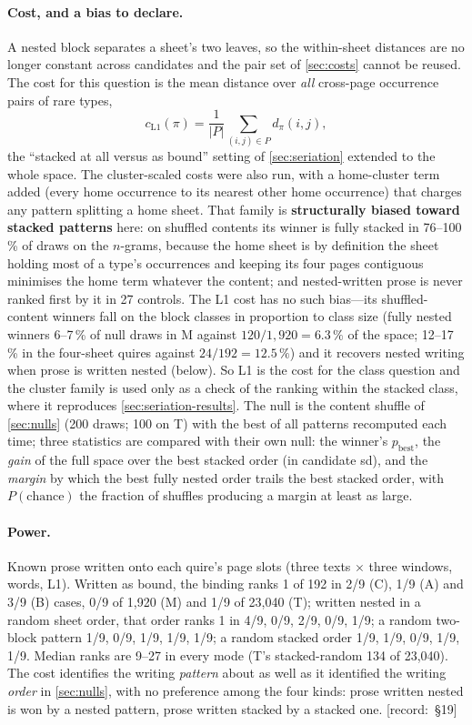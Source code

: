 \documentclass[11pt,a4paper]{article}
\newcommand{\src}[1]{{\footnotesize\color{muted}\sffamily\mbox{[record: \S#1]}}}
\begin{document}
\paragraph{Cost, and a bias to declare.} A nested block separates a sheet's two leaves, so the within-sheet distances are no longer constant across candidates and the pair set of \cref{sec:costs} cannot be reused. The cost for this question is the mean distance over \emph{all} cross-page occurrence pairs of rare types,
\begin{equation}
c_{\mathrm{L1}}(\pi)=\frac{1}{|P|}\sum_{(i,j)\in P} d_\pi(i,j),
\label{eq:l1all}
\end{equation}
the ``stacked at all versus as bound'' setting of \cref{sec:seriation} extended to the whole space. The cluster-scaled costs were also run, with a home-cluster term added (every home occurrence to its nearest other home occurrence) that charges any pattern splitting a home sheet. That family is \textbf{structurally biased toward stacked patterns} here: on shuffled contents its winner is fully stacked in 76--100\,\% of draws on the $n$-grams, because the home sheet is by definition the sheet holding most of a type's occurrences and keeping its four pages contiguous minimises the home term whatever the content; and nested-written prose is never ranked first by it in 27 controls. The L1 cost has no such bias---its shuffled-content winners fall on the block classes in proportion to class size (fully nested winners 6--7\,\% of null draws in M against $120/1,920=6.3\,\%$ of the space; 12--17\,\% in the four-sheet quires against $24/192=12.5\,\%$) and it recovers nested writing when prose is written nested (below). So L1 is the cost for the class question and the cluster family is used only as a check of the ranking within the stacked class, where it reproduces \cref{sec:seriation-results}. The null is the content shuffle of \cref{sec:nulls} (200 draws; 100 on T) with the best of all patterns recomputed each time; three statistics are compared with their own null: the winner's $p_{\text{best}}$, the \emph{gain} of the full space over the best stacked order (in candidate sd), and the \emph{margin} by which the best fully nested order trails the best stacked order, with $P(\text{chance})$ the fraction of shuffles producing a margin at least as large.

\paragraph{Power.} Known prose written onto each quire's page slots (three texts $\times$ three windows, words, L1). Written as bound, the binding ranks 1 of 192 in 2/9 (C), 1/9 (A) and 3/9 (B) cases, 0/9 of 1,920 (M) and 1/9 of 23,040 (T); written nested in a random sheet order, that order ranks 1 in 4/9, 0/9, 2/9, 0/9, 1/9; a random two-block pattern 1/9, 0/9, 1/9, 1/9, 1/9; a random stacked order 1/9, 1/9, 0/9, 1/9, 1/9. Median ranks are 9--27 in every mode (T's stacked-random 134 of 23,040). The cost identifies the writing \emph{pattern} about as well as it identified the writing \emph{order} in \cref{sec:nulls}, with no preference among the four kinds: prose written nested is won by a nested pattern, prose written stacked by a stacked one. \src{19}
\end{document}
